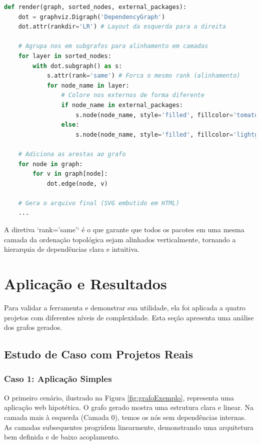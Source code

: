 \documentclass[12pt]{article}
\begin{document}
\begin{lstlisting}[language=Python, caption={Trecho do código de renderização do grafo.}, label={lst:render}]
def render(graph, sorted_nodes, external_packages):
    dot = graphviz.Digraph('DependencyGraph')
    dot.attr(rankdir='LR') # Layout da esquerda para a direita

    # Agrupa nos em subgrafos para alinhamento em camadas
    for layer in sorted_nodes:
        with dot.subgraph() as s:
            s.attr(rank='same') # Forca o mesmo rank (alinhamento)
            for node_name in layer:
                # Colore nos externos de forma diferente
                if node_name in external_packages:
                    s.node(node_name, style='filled', fillcolor='tomato')
                else:
                    s.node(node_name, style='filled', fillcolor='lightgrey')
    
    # Adiciona as arestas ao grafo
    for node in graph:
        for v in graph[node]:
            dot.edge(node, v)
    
    # Gera o arquivo final (SVG embutido em HTML)
    ...
\end{lstlisting}

A diretiva `rank='same'` é o que garante que todos os pacotes em uma mesma camada da ordenação topológica sejam alinhados verticalmente, tornando a hierarquia de dependências clara e intuitiva.

\FloatBarrier

\section{Aplicação e Resultados}
Para validar a ferramenta e demonstrar sua utilidade, ela foi aplicada a quatro projetos com diferentes níveis de complexidade. Esta seção apresenta uma análise dos grafos gerados.

\subsection{Estudo de Caso com Projetos Reais}

\subsubsection{Caso 1: Aplicação Simples}
O primeiro cenário, ilustrado na Figura \ref{fig:grafoExemplo}, representa uma aplicação web hipotética. O grafo gerado mostra uma estrutura clara e linear. Na camada mais à esquerda (Camada 0), temos os nós sem dependências internas. As camadas subsequentes progridem linearmente, demonstrando uma arquitetura bem definida e de baixo acoplamento.
\end{document}
